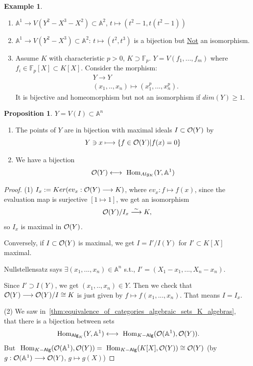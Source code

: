 \documentclass[11pt]{article}
\theoremstyle{definition}
\newtheorem{prop}[thm]{Proposition}
\newtheorem{ex}[thm]{Example}
\renewcommand{\hom}{\text{ Hom}}
\newcommand{\affn}{\mathbb A}
\newcommand{\calo}{{\cal O}}
\newcommand{\lrta}{\longrightarrow}
\newcommand{\llrta}{\longleftrightarrow}
\begin{document}
\begin{ex}\ 
\begin{enumerate}[label=(\arabic*)]
\item $\affn^1\lrta V(Y^2-X^3-X^2)\subset \affn^2$, $t\mapsto (t^2-1,t(t^2-1))$
\item $\affn^1\lrta V(Y^2-X^3)\subset \affn^2$: $t\longmapsto (t^2,t^3)$ is a bijection but \underline{Not} an isomorphism.
\item Assume $K$ with characteristic $p>0$, $K\supset \mathbb{F}_p$. $Y=V(f_1,...,f_m)$ where $f_i\in \mathbb{F}_p[X]\subset K[X]$. Consider the morphism:
$$
\begin{aligned}
&Y\lrta Y\\
& (x_1,..,x_n)\longmapsto (x_1^p,...,x_n^p).
\end{aligned}
$$
It is bijective and homeomorphism but not an isomorphism if $dim(Y)\geq 1$.
\end{enumerate}
\end{ex}
\begin{prop}
$Y=V(I)\subset \affn^n$
\begin{enumerate}[label=(\arabic*)]
\item The points of $Y$ are in bijection with maximal ideals $I\subset \calo(Y)$ by 
$$
Y\ni x\longmapsto \{f\in \calo(Y)|f(x)=0\}
$$
\item We have a bijection 
$$
\calo(Y)\llrta \hom_{Alg_K}(Y,\affn^1)
$$
\end{enumerate}
\end{prop}
\begin{proof}
(1) $I_x:=Ker(ev_x:\calo(Y)\lrta K)$, where $ev_x:f\mapsto f(x)$, since the evaluation map is surjective $[1\mapsto 1]$, we get an isomorphism 
$$
\calo(Y)/I_x\overset{\sim}{\lrta} K,
$$
so $I_x$ is maximal in $\calo(Y)$.

Conversely, if $I\subset \calo(Y)$ is maximal, we get $I=I'/I(Y)$ for $I'\subset K[X]$ maximal. 

Nullstellensatz says $\exists (x_1,...,x_n)\in\affn^n$ s.t., $I'=(X_1-x_1,...,X_n-x_n)$. 

Since $I'\supset I(Y)$, we get $(x_1,..,x_n)\in Y$. Then we check that $\calo(Y)\lrta\calo(Y)/I\cong K$ is just given by $f\mapsto f(x_1,...,x_n)$. That means $I=I_x$.

(2) We saw in~\ref{thm:equivalence_of_categories_algebraic_sets_K_algebras}, that there is a bijection between sets
$$
\hom_{\mathsf{Alg}_K}(Y,\affn^1)\llrta \hom_{K-\mathsf{Alg}}(\calo(\affn^1),\calo(Y)).
$$
But $\hom_{K-\mathsf{Alg}}(\calo(\affn^1),\calo(Y))=\hom_{K-\mathsf{Alg}}(K[X],\calo(Y))\cong \calo(Y)$ (by $g:\calo(\affn^1)\lrta \calo(Y)$, $g\mapsto g(X)$)
\end{proof}
\end{document}
